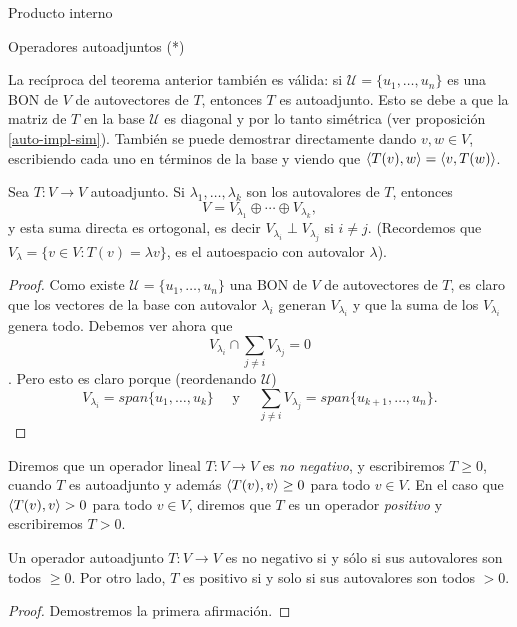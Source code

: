 \begin{chapter}{Producto interno}
\begin{section}{Operadores autoadjuntos (*)}
        
        \begin{obs*} La recíproca del teorema anterior también es válida: si $\mathcal{U} = \{u_1,\ldots,u_n\}$ es una BON de $V$ de autovectores de $T$, entonces $T$ es autoadjunto. Esto se debe a que la matriz de $T$ en la base $\mathcal{U}$ es diagonal y por lo tanto simétrica (ver proposición \ref{auto-impl-sim}). También se puede demostrar directamente dando $v,w \in V$, escribiendo cada uno en términos de la base y viendo que 
            $\langle T(v),w\rangle = \langle v,T(w) \rangle$.
        \end{obs*}
        
        
        \begin{proposicion}\label{desc-ort}
            Sea $T: V \to V$ autoadjunto.  Si $\lambda_1, \ldots,\lambda_k$ son los autovalores de $T$,  entonces 
            $$
            V = V_{\lambda_1}\oplus \cdots \oplus V_{\lambda_k},
            $$
            y  esta suma directa es ortogonal, es decir $V_{\lambda_i} \perp V_{\lambda_j}$  si $i \ne j$.
            (Recordemos que $V_\lambda = \{v \in V: T(v)= \lambda v \}$, es el autoespacio con autovalor $\lambda$). 
        \end{proposicion}
        \begin{proof}
            Como existe $\mathcal{U} = \{u_1,\ldots,u_n\}$ una BON de $V$ de autovectores de $T$, es claro que  los vectores de la base con autovalor $\lambda_i$ generan $V_{\lambda_i}$ y que la suma de los $V_{\lambda_i}$ genera todo. Debemos ver ahora que 
            $$V_{\lambda_i} \cap \sum_{j  \ne i} V_{\lambda_j} = 0 $$. 
            Pero esto es claro porque (reordenando $\mathcal{U}$) 
            $$V_{\lambda_i} = span\{u_1,\ldots,u_k\} \quad \text{ y } \quad \sum_{j  \ne i} V_{\lambda_j} = span\{u_{k+1},\ldots,u_n\}.$$     
        \end{proof}
        
        \begin{definicion}
            Diremos que un operador lineal $T: V \to V$ es \textit{no negativo}, y escribiremos $T \ge 0$, cuando $T$ es autoadjunto  y además $\langle T(v),v \rangle \ge 0$ para todo $v \in V$. En  el caso que $\langle T(v),v \rangle > 0$ para todo  $v \in V$, diremos que $T$ es un operador \textit{positivo} y escribiremos $T>0$.
        \end{definicion}
        
        \begin{teorema}
            Un operador autoadjunto $T: V \to V$  es no negativo si y sólo si sus autovalores son todos $\ge 0$. Por otro lado, $T$ es positivo  si y solo si sus autovalores son todos $> 0$.
        \end{teorema}
        \begin{proof}
            Demostremos la primera afirmación.
            

\end{proof}
\end{section}
\end{chapter}
